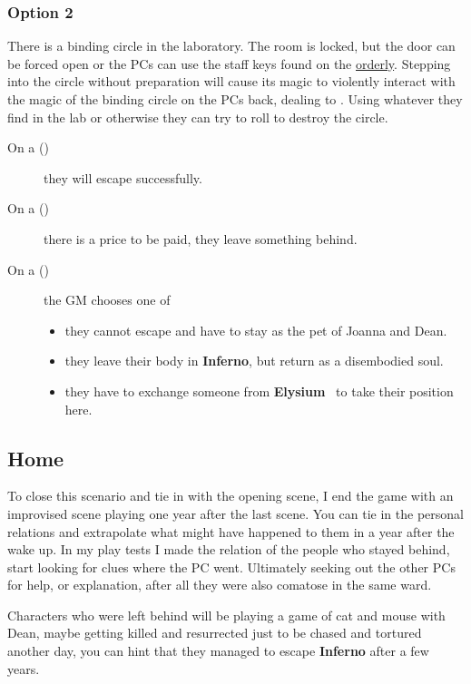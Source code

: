 \subsubsection{Option 2}%
\label{ssub:escape_option2}
There is a binding circle in the laboratory.  The room is locked, but the door can be forced open or the PCs can use the staff
keys found on the \hyperref[ssub:orderly]{orderly}.  Stepping into the circle without preparation will cause its magic to
violently interact with the magic of the binding circle on the PCs back, dealing  to .  Using whatever they find in the lab or otherwise they can try to roll  to
destroy the circle.

\begin{description}
  \item[On a ()] they will escape successfully.
  \item[On a ()] there is a price to be paid, they leave something behind.
  \item[On a ()] the GM chooses one of
        \begin{itemize}[noitemsep]
          \item they cannot escape and have to stay as the pet of Joanna and Dean.
          \item they leave their body in \textbf{Inferno}, but return as a disembodied soul.
          \item they have to exchange someone from \textbf{Elysium}~\cite[p.~224]{KULT:core} to take their position here.
        \end{itemize}
\end{description}

\subsection{Home}%
\label{sub:home}

To close this scenario and tie in with the opening scene, I end the game with an improvised scene playing one year after the
last scene.  You can tie in the personal relations and extrapolate what might have happened to them in a year after the wake up.
In my play tests I made the relation of the people who stayed behind, start looking for clues where the PC went.  Ultimately
seeking out the other PCs for help, or explanation, after all they were also comatose in the same ward.

Characters who were left behind will be playing a game of cat and mouse with Dean, maybe getting killed and
resurrected just to be chased and tortured another day, you can hint that they managed to escape \textbf{Inferno} after a few
years.

\clearpage %
